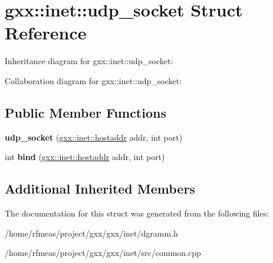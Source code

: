 \hypertarget{structgxx_1_1inet_1_1udp__socket}{}\section{gxx\+:\+:inet\+:\+:udp\+\_\+socket Struct Reference}
\label{structgxx_1_1inet_1_1udp__socket}


Inheritance diagram for gxx\+:\+:inet\+:\+:udp\+\_\+socket\+:


Collaboration diagram for gxx\+:\+:inet\+:\+:udp\+\_\+socket\+:
\subsection*{Public Member Functions}
\begin{DoxyCompactItemize}
\item 
{\bfseries udp\+\_\+socket} (\hyperlink{classgxx_1_1hostaddr}{gxx\+::inet\+::hostaddr} addr, int port)\hypertarget{structgxx_1_1inet_1_1udp__socket_af36718f133587add035f70beb0ae7f66}{}\label{structgxx_1_1inet_1_1udp__socket_af36718f133587add035f70beb0ae7f66}

\item 
int {\bfseries bind} (\hyperlink{classgxx_1_1hostaddr}{gxx\+::inet\+::hostaddr} addr, int port)\hypertarget{structgxx_1_1inet_1_1udp__socket_ae8b085d7b100fd29c2c2fd6b598ba3ed}{}\label{structgxx_1_1inet_1_1udp__socket_ae8b085d7b100fd29c2c2fd6b598ba3ed}

\end{DoxyCompactItemize}
\subsection*{Additional Inherited Members}


The documentation for this struct was generated from the following files\+:\begin{DoxyCompactItemize}
\item 
/home/rfmeas/project/gxx/gxx/inet/dgramm.\+h\item 
/home/rfmeas/project/gxx/gxx/inet/src/common.\+cpp\end{DoxyCompactItemize}

